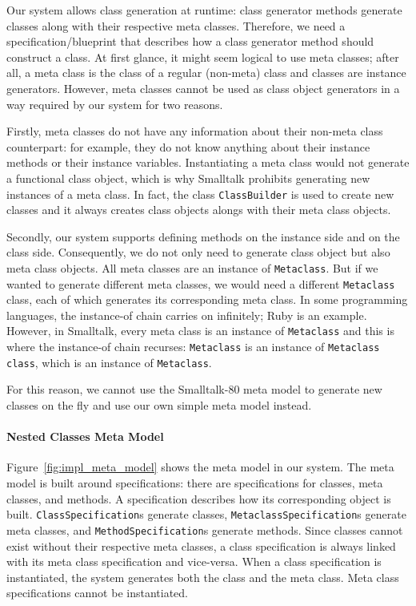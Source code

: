 Our system allows class generation at runtime: class generator methods generate classes along with their respective meta classes. Therefore, we need a specification/blueprint that describes how a class generator method should construct a class. At first glance, it might seem logical to use meta classes; after all, a meta class is the class of a regular (non-meta) class and classes are instance generators. However, meta classes cannot be used as class object generators in a way required by our system for two reasons.

Firstly, meta classes do not have any information about their non-meta class counterpart: for example, they do not know anything about their instance methods or their instance variables. Instantiating a meta class would not generate a functional class object, which is why Smalltalk prohibits generating new instances of a meta class. In fact, the class \texttt{ClassBuilder} is used to create new classes and it always creates class objects alongs with their meta class objects.

Secondly, our system supports defining methods on the instance side and on the class side. Consequently, we do not only need to generate class object but also meta class objects. All meta classes are an instance of \texttt{Metaclass}. But if we wanted to generate different meta classes, we would need a different \texttt{Metaclass} class, each of which generates its corresponding meta class. In some programming languages, the instance-of chain carries on infinitely; Ruby is an example. However, in Smalltalk, every meta class is an instance of \texttt{Metaclass} and this is where the instance-of chain recurses: \texttt{Metaclass} is an instance of \texttt{Metaclass class}, which is an instance of \texttt{Metaclass}.

For this reason, we cannot use the Smalltalk-80 meta model to generate new classes on the fly and use our own simple meta model instead.

\paragraph{Nested Classes Meta Model}
Figure~\ref{fig:impl_meta_model} shows the meta model in our system. The meta model is built around specifications: there are specifications for classes, meta classes, and methods. A specification describes how its corresponding object is built. \texttt{ClassSpecification}s generate classes, \texttt{MetaclassSpecification}s generate meta classes, and \texttt{MethodSpecification}s generate methods. Since classes cannot exist without their respective meta classes, a class specification is always linked with its meta class specification and vice-versa. When a class specification is instantiated, the system generates both the class and the meta class. Meta class specifications cannot be instantiated.

